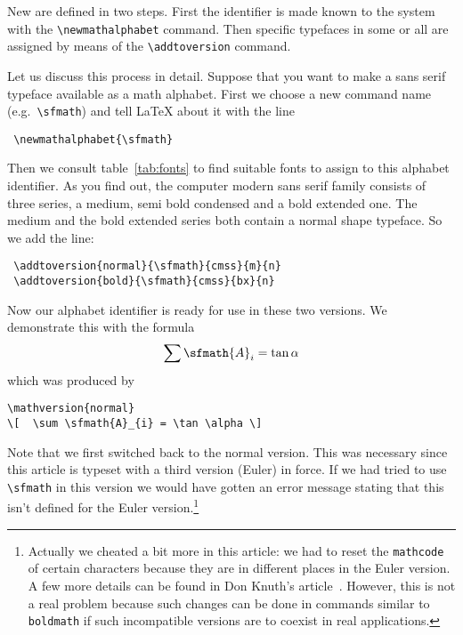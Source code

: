  New  are defined in
 two steps. First the identifier is made known to the
 system with the \verb+\newmathalphabet+ command. Then
 specific typefaces in some or all 
 are assigned by means of the \verb+\addtoversion+
 command.
 
 Let us discuss this process in detail. Suppose that
 you want to make a sans serif typeface available as a
 math alphabet. First we choose a new command name
 (e.g.\ \verb+\sfmath+) and tell \LaTeX{} about it with
 the line
\begin{verbatim}
 \newmathalphabet{\sfmath}
\end{verbatim}
 Then we consult table~\ref{tab:fonts} to find suitable
 fonts to assign to this alphabet identifier.  As you
 find out, the computer modern sans serif family
 consists of three series, a medium, semi bold
 condensed and a bold extended one. The medium and the
 bold extended series both contain a normal shape
 typeface. So we add the line:
\begin{verbatim}
 \addtoversion{normal}{\sfmath}{cmss}{m}{n}
 \addtoversion{bold}{\sfmath}{cmss}{bx}{n}
\end{verbatim}
Now our alphabet identifier is ready for use in these two versions.
We demonstrate this with the formula
{ \resetmathcodes
\[  \sum \sfmath{A}_{i} = \tan \alpha \]}%
which was produced by
\begin{verbatim}
\mathversion{normal}
\[  \sum \sfmath{A}_{i} = \tan \alpha \]
\end{verbatim}
 Note that we first switched back to the normal version. This was
 necessary since this article is typeset with a third version (Euler)
 in force. If we had tried to use \verb+\sfmath+ in this version
 we would have gotten an error message stating that this
 isn't defined for the Euler version.\footnote{Actually we cheated a
 bit more in this article: we had to reset the {\tt\bslash mathcode}
 of certain characters because they are in different places in the
 Euler version.  A few more details can be found in Don Knuth's
 article~\protect\cite{art:euler}. However, this is not a real problem
 because such changes can be done in commands similar to {\tt\bslash
 boldmath} if such incompatible versions are to coexist in real
 applications.}
 
